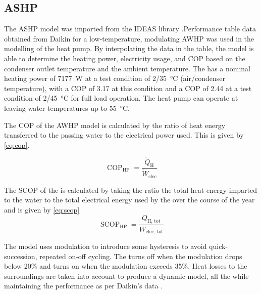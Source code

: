 \subsection{\acs{ASHP}} \label{subsec:ashp}
The \ac{ASHP} model was imported from the IDEAS library \cite{jorissen_implementation_2018}.Performance table data obtained from Daikin for a low-temperature, modulating \ac{AWHP} was used in the modelling of the heat pump. By interpolating the data in the table, the model is able to determine the heating power, electricity usage, and \ac{COP} based on the condenser outlet temperature and the ambient temperature. The \HP has a nominal heating power of \qty{7177}{\watt} at a test condition of 2/\qty{35}{\celsius} (air/condenser temperature), with a \ac{COP} of 3.17 at this condition and a \ac{COP} of 2.44 at a test condition of 2/\qty{45}{\celsius} for full load operation. The heat pump can operate at leaving water temperatures up to \qty{55}{\celsius}.

The \ac{COP} of the \ac{AWHP} model is calculated by the ratio of heat energy transferred to the passing water to the electrical power used. This is given by \cref{eq:cop}. 

\begin{equation}
    \operatorname{COP}_\text{HP}=\frac{\dot{Q}_\text{H}}{\dot{W}_\text{elec}}\label{eq:cop}
\end{equation}

The \ac{SCOP} of the \HP is calculated by taking the ratio the total heat energy imparted to the water to the total electrical energy used by the \HP over the course of the year and is given by \cref{eq:scop}
\begin{equation}
    \operatorname{SCOP}_\text{HP}=\frac{Q_\text{H, tot}}{W_\text{elec, tot}}\label{eq:scop}
\end{equation}

The model uses modulation to introduce some hysteresis to avoid quick-succession, repeated on-off cycling. The \HP turns off when the modulation drops below 20\% and turns on when the modulation exceeds 35\%. Heat losses to the surroundings are taken into account to produce a dynamic model, all the while maintaining the performance as per Daikin's data \cite{daikin_altherma_tech_2006}.

